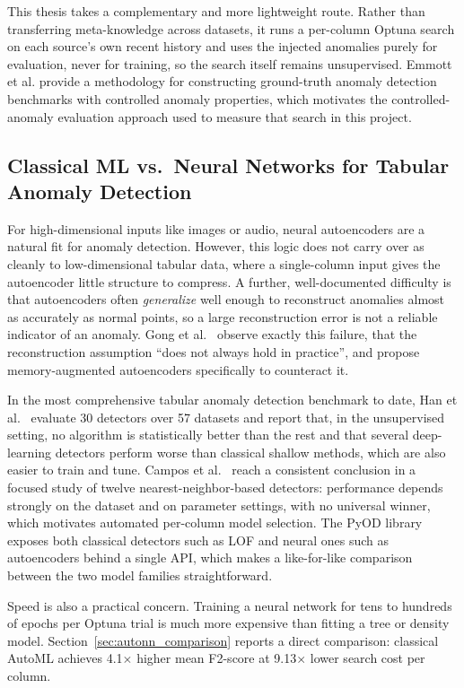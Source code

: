\documentclass[12pt]{article}
\begin{document}
This thesis takes a complementary and more lightweight route. Rather than transferring meta-knowledge across datasets, it runs a per-column Optuna search on each source's own recent history and uses the injected anomalies purely for evaluation, never for training, so the search itself remains unsupervised. Emmott et al. \cite{emmott2013systematic} provide a methodology for constructing ground-truth anomaly detection benchmarks with controlled anomaly properties, which motivates the controlled-anomaly evaluation approach used to measure that search in this project.

\subsection{Classical ML vs.\ Neural Networks for Tabular Anomaly Detection}
\label{sec:relwork_nn}

For high-dimensional inputs like images or audio, neural autoencoders are a natural fit for anomaly detection. However, this logic does not carry over as cleanly to low-dimensional tabular data, where a single-column input gives the autoencoder little structure to compress. A further, well-documented difficulty is that autoencoders often \emph{generalize} well enough to reconstruct anomalies almost as accurately as normal points, so a large reconstruction error is not a reliable indicator of an anomaly. Gong et al.\ \cite{gong2019memae} observe exactly this failure, that the reconstruction assumption ``does not always hold in practice'', and propose memory-augmented autoencoders specifically to counteract it.

In the most comprehensive tabular anomaly detection benchmark to date, Han et al.\ \cite{han2022adbench} evaluate 30 detectors over 57 datasets and report that, in the unsupervised setting, no algorithm is statistically better than the rest and that several deep-learning detectors perform worse than classical shallow methods, which are also easier to train and tune. Campos et al.\ \cite{campos2016evaluation} reach a consistent conclusion in a focused study of twelve nearest-neighbor-based detectors: performance depends strongly on the dataset and on parameter settings, with no universal winner, which motivates automated per-column model selection. The PyOD library \cite{zhao2019pyod} exposes both classical detectors such as LOF and neural ones such as autoencoders behind a single API, which makes a like-for-like comparison between the two model families straightforward.

Speed is also a practical concern. Training a neural network for tens to hundreds of epochs per Optuna trial is much more expensive than fitting a tree or density model. Section~\ref{sec:autonn_comparison} reports a direct comparison: classical AutoML achieves 4.1$\times$ higher mean F2-score at 9.13$\times$ lower search cost per column.
\end{document}
